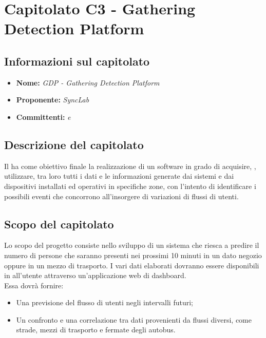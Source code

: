 \section{Capitolato C3 - Gathering Detection Platform}\label{C3}
\subsection{Informazioni sul capitolato}
\begin{itemize}
	\item \textbf{Nome:} \textit{GDP - Gathering Detection Platform} 
	\item \textbf{Proponente:} \textit{SyncLab}
	\item \textbf{Committenti:} \textit{\VT{} e \CR{}}
\end{itemize}

\subsection{Descrizione del capitolato}
Il  ha come obiettivo finale la realizzazione di un  software in grado di acquisire, , utilizzare,  tra loro tutti i dati e le informazioni generate dai sistemi e dai dispositivi installati ed operativi in specifiche zone, con l’intento di identificare i possibili eventi che concorrono all’insorgere di variazioni di flussi di utenti.

\subsection{Scopo del capitolato}
Lo scopo del progetto consiste nello sviluppo di un sistema che riesca a predire il numero di persone che saranno presenti nei prossimi 10 minuti in un dato negozio oppure in un mezzo di trasporto. I vari dati elaborati dovranno essere disponibili in  all'utente attraverso un'applicazione web di dashboard. \\
Essa dovrà fornire:
\begin{itemize}
	\item Una previsione del flusso di utenti negli intervalli futuri;
	\item Un confronto e una correlazione tra dati provenienti da flussi diversi, come strade, mezzi di trasporto e fermate degli autobus.
\end{itemize}

